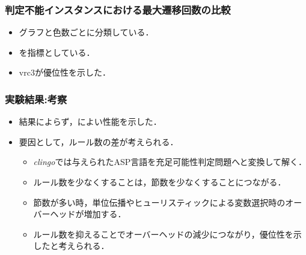 \begin{frame}\frametitle{判定不能インスタンスにおける最大遷移回数の比較}
  
  \begin{table}[t]
    \centering
    
  \end{table}

  \begin{itemize}
    \item グラフと色数ごとに分類している．
    \item {}を指標としている．
    \item vrc3が優位性を示した．
  \end{itemize}

\end{frame}


\begin{frame}\frametitle{実験結果:考察}

  \begin{itemize}
    \item 結果によらず，によい性能を示した．
    \item 要因として，\alert{ルール数の差}が考えられる．
    \begin{itemize}
      \item \textit{clingo}では与えられたASP言語を充足可能性判定問題へと変換して解く．
      \item ルール数を少なくすることは，節数を少なくすることにつながる．
      \item 節数が多い時，単位伝播やヒューリスティックによる変数選択時のオーバーヘッドが増加する．
      \item ルール数を抑えることでオーバーヘッドの減少につながり，優位性を示したと考えられる．
    \end{itemize}
  \end{itemize}
  
\end{frame}

\backupend